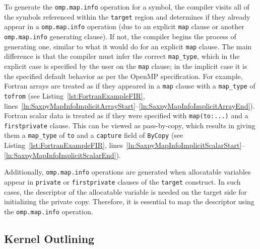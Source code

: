 \documentclass[acmtog,natbib=false]{acmart}
\newcommand{\code}[1]{\texttt{#1}\xspace}
\begin{document}
To generate the \code{omp.map.info} operation for a symbol, the compiler visits all of the symbols referenced within the \code{target} region and determines if they already appear in a \code{omp.map.info} operation (due to an explicit \code{map} clause or another \code{omp.map.info} generating clause). 
If not, the compiler begins the process of generating one, similar to what it would do for an explicit \code{map} clause.
The main difference is that the compiler must infer the correct \code{map\_type}, which in the explicit case is specified by the user on the \code{map} clause; in the implicit case it is the specified default behavior as per the OpenMP specification.
For example, Fortran arrays are treated as if they appeared in a \code{map} clause with a \code{map\_type} of \code{tofrom} (see Listing~\ref{lst:FortranExampleFIR}, lines~\ref{ln:SaxpyMapInfoImplicitArrayStart}--\ref{ln:SaxpyMapInfoImplicitArrayEnd}).
Fortran scalar data is treated as if they were specified with \code{map(to:...)} and a \code{firstprivate} clause.
This can be viewed as pass-by-copy, which results in giving them a \code{map\_type} of \code{to} and a \code{capture} field of \code{ByCopy} (see Listing~\ref{lst:FortranExampleFIR}, lines~\ref{ln:SaxpyMapInfoImplicitScalarStart}--\ref{ln:SaxpyMapInfoImplicitScalarEnd}). 

Additionally, \code{omp.map.info} operations are generated when allocatable variables appear in \code{private} or \code{firstprivate} clauses of the \code{target} construct.
In such cases, the descriptor of the allocatable variable is needed on the target side for initializing the private copy.
Therefore, it is essential to map the descriptor using the \code{omp.map.info} operation.


\subsection{Kernel Outlining}
\label{sec:KernelOutlining}
\end{document}
